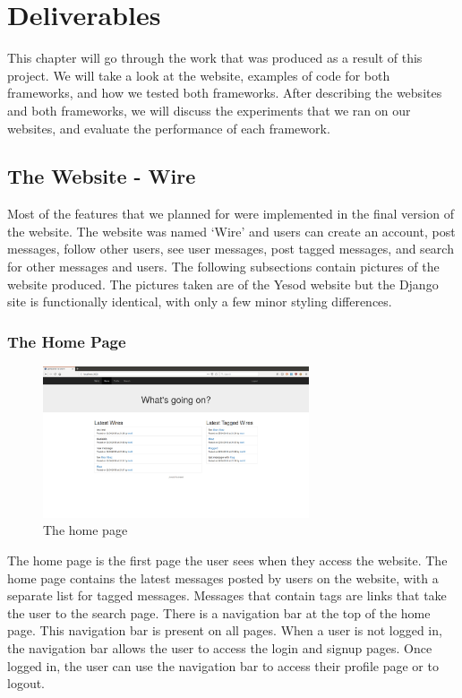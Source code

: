 \chapter{Deliverables}
\label{chap:Deliverable}

This chapter will go through the work that was produced as a result of this
project. We will take a look at the website, examples of code for both frameworks,
and how we tested both frameworks. After describing the websites and both frameworks,
we will discuss the experiments that we ran on our websites, and evaluate
the performance of each framework.

\section{The Website - Wire}

Most of the features that we planned for were implemented in the final version
of the website. The website was named `Wire' and users can create an account,
post messages, follow other users, see user messages, post tagged
messages, and search for other messages and users. The following subsections
contain pictures of the website produced. The pictures taken are of the Yesod
website but the Django site is functionally identical, with only a few minor styling
differences.

\subsection{The Home Page}

\begin{figure}[H]
	\centering
	\includegraphics[width=0.7\textwidth]{final_report/pics/home.png}
	\caption{The home page}
	\label{fig:wireHome}
\end{figure}

The home page is the first page the user sees when they access the website.
The home page contains the latest messages posted by users on the website,
with a separate list for tagged messages. Messages that contain tags are links
that take the user to the search page. There is a navigation bar at the top of
the home page. This navigation bar is present on all pages. When a user is not
logged in, the navigation bar allows the user to access the login and signup pages.
Once logged in, the user can use the navigation bar to access their profile page
or to logout.

